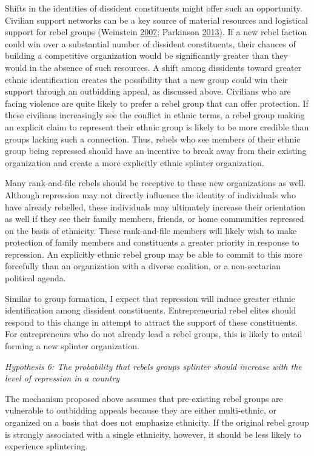 \documentclass[12pt,]{book}
\theoremstyle{definition}
\theoremstyle{definition}
\theoremstyle{definition}
\theoremstyle{remark}
\begin{document}
Shifts in the identities of dissident constituents might offer such an
opportunity. Civilian support networks can be a key source of material
resources and logistical support for rebel groups (Weinstein
\protect\hyperlink{ref-Weinstein2007}{2007}; Parkinson
\protect\hyperlink{ref-Parkinson2013c}{2013}). If a new rebel faction
could win over a substantial number of dissident constituents, their
chances of building a competitive organization would be significantly
greater than they would in the absence of such resources. A shift among
dissidents toward greater ethnic identification creates the possibility
that a new group could win their support through an outbidding appeal,
as discussed above. Civilians who are facing violence are quite likely
to prefer a rebel group that can offer protection. If these civilians
increasingly see the conflict in ethnic terms, a rebel group making an
explicit claim to represent their ethnic group is likely to be more
credible than groups lacking such a connection. Thus, rebels who see
members of their ethnic group being repressed should have an incentive
to break away from their existing organization and create a more
explicitly ethnic splinter organization.

Many rank-and-file rebels should be receptive to these new organizations
as well. Although repression may not directly influence the identity of
individuals who have already rebelled, these individuals may ultimately
increase their orientation as well if they see their family members,
friends, or home communities repressed on the basis of ethnicity. These
rank-and-file members will likely wish to make protection of family
members and constituents a greater priority in response to repression.
An explicitly ethnic rebel group may be able to commit to this more
forcefully than an organization with a diverse coalition, or a
non-sectarian political agenda.

Similar to group formation, I expect that repression will induce greater
ethnic identification among dissident constituents. Entrepreneurial
rebel elites should respond to this change in attempt to attract the
support of these constituents. For entrepreneurs who do not already lead
a rebel groups, this is likely to entail forming a new splinter
organization.

\emph{Hypothesis 6: The probability that rebels groups splinter should
increase with the level of repression in a country}

The mechanism proposed above assumes that pre-existing rebel groups are
vulnerable to outbidding appeals because they are either multi-ethnic,
or organized on a basis that does not emphasize ethnicity. If the
original rebel group is strongly associated with a single ethnicity,
however, it should be less likely to experience splintering.
\end{document}
